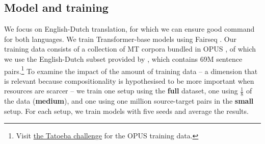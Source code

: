 \subsection{Model and training}\label{sec:model}

We focus on English-Dutch translation, for which we can ensure good command for both languages.
We train Transformer-base models \citep{vaswani2017attention} using Fairseq \citep{ott2019fairseq}.
Our training data consists of a collection of MT corpora bundled in \textsc{OPUS} \citep{tiedemann2020opus}, of which we use the English-Dutch subset provided by \citet{tiedemann-2020-tatoeba}, which contains 69M sentence pairs.\footnote{Visit \href{https://github.com/Helsinki-NLP/Tatoeba-Challenge/blob/master/data/README-v2020-07-28.md}{the Tatoeba challenge} for the \textsc{OPUS} training data.}
To examine the impact of the amount of training data -- a dimension that is relevant because compositionality is hypothesised to be more important when resources are scarcer -- we train one setup using the \textbf{full} dataset, one using $\frac{1}{8}$ of the data (\textbf{medium}), and one using one million source-target pairs in the \textbf{small} setup. 
For each setup, we train models with five seeds and average the results.

